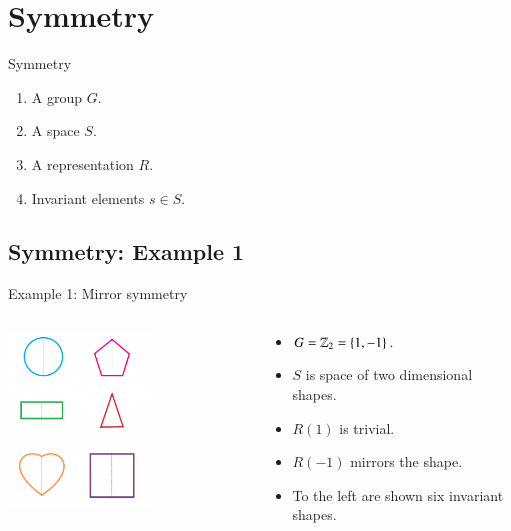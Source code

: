\documentclass{beamer}
\begin{document}
\section{Symmetry}

\begin{frame}{Symmetry}
	\begin{enumerate}
		\item A group $G$.
		\item A space $S$.
		\item A representation $R$.
		\item Invariant elements $s\in S$.
	\end{enumerate}
\end{frame}

\subsection{Symmetry: Example 1}

\begin{frame}{Example 1: Mirror symmetry}
	\begin{columns}
		\begin{column}{0.6\textwidth}
			\begin{center}
				\includegraphics[width=0.6\textwidth]{Images/symmetry_shapes.png}
			\end{center}
		\end{column}
		\begin{column}{0.4\textwidth}
			\begin{itemize}
				\item $G=\mathbb{Z}_2=\{1,-1\}$.
				\item $S$ is space of two dimensional shapes.
				\item $R(1)$ is trivial.
				\item $R(-1)$ mirrors the shape.
				\item To the left are shown six invariant shapes.
			\end{itemize}
		\end{column}
	\end{columns}
\end{frame}
\end{document}
